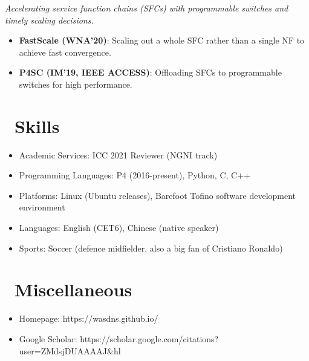 \documentclass{resume}
\begin{document}
\emph{Accelerating service function chains (SFCs) with programmable switches and timely scaling decisions.}
\begin{itemize}
  \item \textbf{FastScale (WNA'20)}: Scaling out a whole SFC rather than a single NF to achieve fast convergence. 
  \item \textbf{P4SC (IM'19, IEEE ACCESS)}: Offloading SFCs to programmable switches for high performance.
\end{itemize}


\section{\faCogs\ Skills}
\begin{itemize}[parsep=0.5ex]
  \item Academic Services: ICC 2021 Reviewer (NGNI track)
  \item Programming Languages: P4 (2016-present), Python, C, C++
  \item Platforms: Linux (Ubuntu releases), Barefoot Tofino software development environment
  \item Languages: English (CET6), Chinese (native speaker)
  \item Sports: Soccer (defence midfielder, also a big fan of Cristiano Ronaldo)
\end{itemize}


\section{\faInfo\ Miscellaneous}
\begin{itemize}[parsep=0.5ex]
  \item Homepage: https://wasdns.github.io/
  \item Google Scholar: https://scholar.google.com/citations?user=ZMdsjDUAAAAJ\&hl
\end{itemize}

%
%
\end{document}
